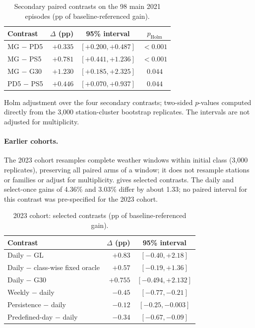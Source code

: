 \begin{table}[!htbp]
\centering
\begin{threeparttable}
\caption{Secondary paired contrasts on the 98 main 2021 episodes (pp of baseline-referenced gain).}
\label{tab:secondary}
\small
\begin{tabular}{lrcc}
\toprule
Contrast & $\Delta$ (pp) & 95\% interval & $p_{\mathrm{Holm}}$\tnote{a}\\
\midrule
MG $-$ PD5   & $+0.335$ & $[+0.200, +0.487]$ & $<0.001$\\
MG $-$ PS5   & $+0.781$ & $[+0.441, +1.236]$ & $<0.001$\\
MG $-$ G30   & $+1.230$ & $[+0.185, +2.325]$ & $0.044$\\
PD5 $-$ PS5  & $+0.446$ & $[+0.070, +0.937]$ & $0.044$\\
\bottomrule
\end{tabular}
\begin{tablenotes}\footnotesize
\item[a] Holm adjustment over the four secondary contrasts; two-sided $p$-values computed directly from the 3,000
station-cluster bootstrap replicates. The intervals are not adjusted for multiplicity.
\end{tablenotes}
\end{threeparttable}
\end{table}

\paragraph{Earlier cohorts.}
The 2023 cohort resamples complete weather windows within initial class (3,000 replicates), preserving all paired arms
of a window; it does not resample stations or families or adjust for multiplicity.  gives selected contrasts.
The daily and select-once gains of 4.36\% and 3.03\% differ by about 1.33\pp; no paired interval for this contrast was
pre-specified for the 2023 cohort.

\begin{table}[!htbp]
\centering
\caption{2023 cohort: selected contrasts (pp of baseline-referenced gain).}
\label{tab:2023contr}
\small
\begin{tabular}{lrc}
\toprule
Contrast & $\Delta$ (pp) & 95\% interval\\
\midrule
Daily $-$ GL                       & $+0.83$  & $[-0.40, +2.18]$\\
Daily $-$ class-wise fixed oracle  & $+0.57$  & $[-0.19, +1.36]$\\
Daily $-$ G30                      & $+0.755$ & $[-0.494, +2.132]$\\
Weekly $-$ daily                   & $-0.45$  & $[-0.77, -0.21]$\\
Persistence $-$ daily              & $-0.12$  & $[-0.25, -0.003]$\\
Predefined-day $-$ daily           & $-0.34$  & $[-0.67, -0.09]$\\
\bottomrule
\end{tabular}
\end{table}

